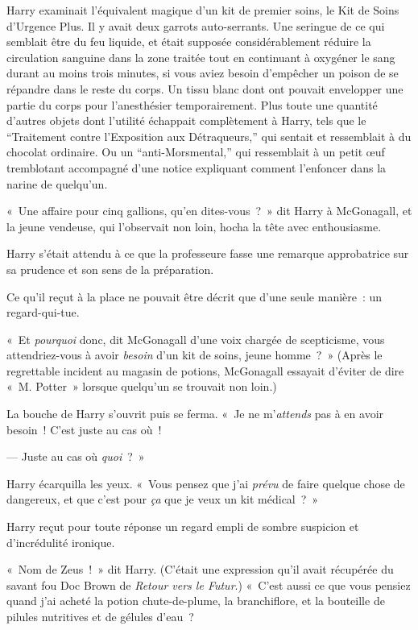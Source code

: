 Harry examinait l'équivalent magique d'un kit de premier soins, le Kit de Soins d'Urgence Plus.
Il y avait deux garrots auto-serrants.
Une seringue de ce qui semblait être du feu liquide, et était supposée considérablement réduire la circulation sanguine dans la zone traitée tout en continuant à oxygéner le sang durant au moins trois minutes, si vous aviez besoin d'empêcher un poison de se répandre dans le reste du corps.
Un tissu blanc dont ont pouvait envelopper une partie du corps pour l'anesthésier temporairement.
Plus toute une quantité d'autres objets dont l'utilité échappait complètement à Harry, tels que le “Traitement contre l'Exposition aux Détraqueurs,” qui sentait et ressemblait à du chocolat ordinaire.
Ou un “anti-Morsmental,” qui ressemblait à un petit œuf tremblotant accompagné d'une notice expliquant comment l'enfoncer dans la narine de quelqu'un.

«~Une affaire pour cinq gallions, qu'en dites-vous~?~» dit Harry à McGonagall, et la jeune vendeuse, qui l'observait non loin, hocha la tête avec enthousiasme.

Harry s'était attendu à ce que la professeure fasse une remarque approbatrice sur sa prudence et son sens de la préparation.

Ce qu'il reçut à la place ne pouvait être décrit que d'une seule manière~: un regard-qui-tue.

«~Et \emph{pourquoi} donc, dit McGonagall d'une voix chargée de scepticisme, vous attendriez-vous à avoir \emph{besoin} d'un kit de soins, jeune homme~?~»
(Après le regrettable incident au magasin de potions, McGonagall essayait d'éviter de dire «~M. Potter~» lorsque quelqu'un se trouvait non loin.)

La bouche de Harry s'ouvrit puis se ferma.
«~Je ne m'\emph{attends} pas à en avoir besoin~! C'est juste au cas où~!

--- Juste au cas où \emph{quoi}~?~»

Harry écarquilla les yeux. «~Vous pensez que j'ai \emph{prévu} de faire quelque chose de dangereux, et que c'est pour \emph{ça} que je veux un kit médical~?~»

Harry reçut pour toute réponse un regard empli de sombre suspicion et d'incrédulité ironique.

«~Nom de Zeus~!~» dit Harry. (C'était une expression qu'il avait récupérée du savant fou Doc Brown de \emph{Retour vers le Futur}.) «~C'est aussi ce que vous pensiez quand j'ai acheté la potion chute-de-plume, la branchiflore, et la bouteille de pilules nutritives et de gélules d'eau~?

